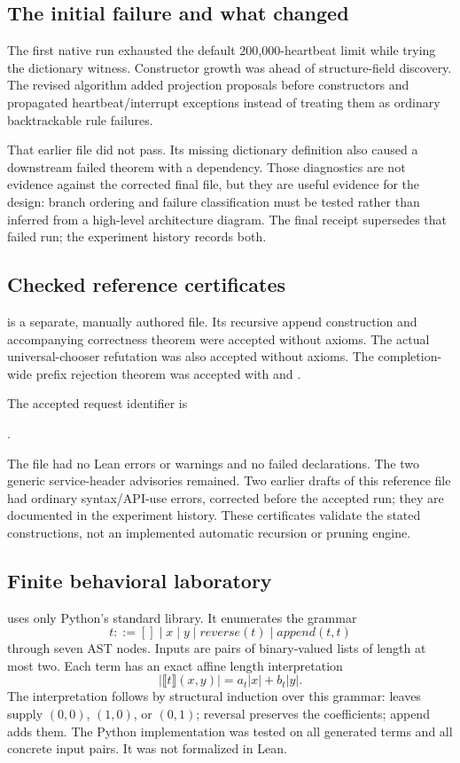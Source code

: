 \subsection{The initial failure and what changed}
The first native run exhausted the default 200,000-heartbeat limit while trying the dictionary witness. Constructor growth was ahead of structure-field discovery. The revised algorithm added projection proposals before constructors and propagated heartbeat/interrupt exceptions instead of treating them as ordinary backtrackable rule failures.

That earlier file did not pass. Its missing dictionary definition also caused a downstream failed theorem with a  dependency. Those diagnostics are not evidence against the corrected final file, but they are useful evidence for the design: branch ordering and failure classification must be tested rather than inferred from a high-level architecture diagram. The final receipt supersedes that failed run; the experiment history records both.

\subsection{Checked reference certificates}
 is a separate, manually authored file. Its recursive append construction and accompanying correctness theorem were accepted without axioms. The actual universal-chooser refutation was also accepted without axioms. The completion-wide prefix rejection theorem was accepted with  and .

The accepted request identifier is
\begin{center}\small{}.\end{center}
The file had no Lean errors or warnings and no failed declarations. The two generic service-header advisories remained. Two earlier drafts of this reference file had ordinary syntax/API-use errors, corrected before the accepted run; they are documented in the experiment history. These certificates validate the stated constructions, not an implemented automatic recursion or pruning engine.

\subsection{Finite behavioral laboratory}
 uses only Python's standard library. It enumerates the grammar
\[
 t ::= []\mid x\mid y\mid \mathit{reverse}(t)\mid
       \mathit{append}(t,t)
\]
through seven AST nodes. Inputs are pairs of binary-valued lists of length at most two. Each term has an exact affine length interpretation
\[
 |\llbracket t\rrbracket(x,y)|=a_t|x|+b_t|y|.
\]
The interpretation follows by structural induction over this grammar: leaves supply $(0,0)$, $(1,0)$, or $(0,1)$; reversal preserves the coefficients; append adds them. The Python implementation was tested on all generated terms and all concrete input pairs. It was not formalized in Lean.


